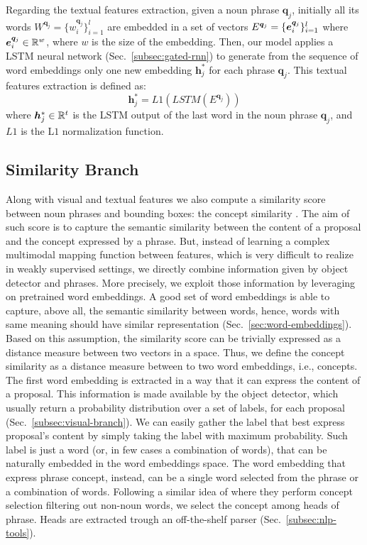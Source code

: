 Regarding the textual features extraction, given a noun phrase
$\bm{q}_j$, initially all its words $W^{\bm{q}_j} = \{ w^{\bm{q}_j}_i
\}^l_{i=1}$ are embedded in a set of vectors $E^{\bm{q}_j} = \{ \bm{e}^{\bm{q}_j}_i
\}^l_{i=1}$ where $\bm{e}^{\bm{q}_j}_i \in \mathbb{R}^w$, where $w$ is the size of the
embedding. Then, our model applies a LSTM neural network
(Sec.~\ref{subsec:gated-rnn}) to generate from the sequence of word
embeddings only one new embedding $\bm{h}^*_j$ for each phrase
$\bm{q}_j$. This textual features extraction is defined as:
\begin{equation}
  \bm{h}^*_j = L1(LSTM(E^{\bm{q}_j}))
  \label{eq:h-star}
\end{equation}
where $\bm{h}^*_j \in \mathbb{R}^t$ is the LSTM output of the last word in
the noun phrase $\bm{q}_j$, and $L1$ is the L$1$ normalization
function.

\subsection{Similarity Branch}
\label{subsec:similarity-branch}

Along with visual and textual features we also compute a similarity
score between noun phrases and bounding boxes: the concept similarity
\cite{wang2019phrase}. The aim of such score is to capture the
semantic similarity between the content of a proposal and the concept
expressed by a phrase. But, instead of learning a complex multimodal
mapping function between features, which is very difficult to realize
in weakly supervised settings, we directly combine information given
by object detector and phrases. More precisely, we exploit those
information by leveraging on pretrained word embeddings. A good set of
word embeddings is able to capture, above all, the semantic similarity
between words, hence, words with same meaning should have similar
representation (Sec.~\ref{sec:word-embeddings}). Based on this
assumption, the similarity score can be trivially expressed as a
distance measure between two vectors in a space. Thus, we define the
concept similarity as a distance measure between to two word
embeddings, i.e., concepts. The first word embedding is extracted in a
way that it can express the content of a proposal. This information is
made available by the object detector, which usually return a
probability distribution over a set of labels, for each proposal
(Sec.~\ref{subsec:visual-branch}). We can easily gather the label that
best express proposal's content by simply taking the label with
maximum probability. Such label is just a word (or, in few cases a
combination of words), that can be naturally embedded in the word
embeddings space. The word embedding that express phrase concept,
instead, can be a single word selected from the phrase or a
combination of words. Following a similar idea of
\cite{javed2018learning} where they perform concept selection
filtering out non-noun words, we select the concept among heads of
phrase. Heads are extracted trough an off-the-shelf parser
(Sec.~\ref{subsec:nlp-tools}). 

